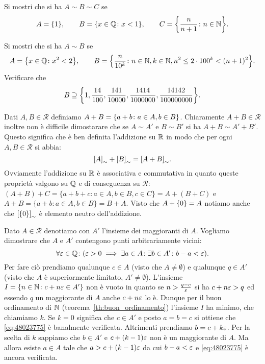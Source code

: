 \begin{exercise}
  Si mostri che si ha $A \sim B \sim C$ se
  \[
  A = {\left\{ 1 \right\}}, \qquad 
  B = {\left\{ x\in {\mathbb Q}\colon x<1 \right\}}, \qquad
  C = {\left\{ \frac{n}{n+1}\colon n\in {\mathbb N} \right\}}.
  \]
\end{exercise}

\begin{exercise}
  Si mostri che si ha $A\sim B$ se
  \[
  A = {\left\{ x\in {\mathbb Q}\colon x^2<2 \right\}}, \qquad
  B = {\left\{ \frac{n}{10^k}\colon n\in {\mathbb N}, k\in {\mathbb N}, n^2 \le 2\cdot 100^k < (n+1)^2 \right\}}.  
  \]
  Verificare che 
  \[
    B \supseteq {\left\{ 
      1,\frac{14}{100},\frac{141}{10000},\frac{1414}{1000000},
      \frac{14142}{100000000} \right\}}.
  \]
\end{exercise}

Dati $A,B\in\mathcal R$ definiamo $A+B={\left\{ a+b\colon a\in A, b\in B \right\}}$.
Chiaramente $A+B\in \mathcal R$ inoltre non è difficile dimostarare che 
se $A\sim A'$ e $B\sim B'$ si ha $A+B\sim A'+B'$.
Questo significa che è ben definita l'addizione su ${\mathbb R}$ in modo che 
per ogni $A,B \in \mathcal R$ si abbia:
\[
{\left[ A \right]}_\sim + {\left[ B \right]}_\sim = {\left[ A+B \right]}_\sim.
\]
Ovviamente l'addizione su ${\mathbb R}$ è associativa e commutativa in quanto 
queste proprietà valgono su ${\mathbb Q}$ e di conseguenza su $\mathcal R$:
$(A+B)+C = \{ a+b+c\colon a\in A, b\in B, c\in C\} = A + (B+C)$ e 
$A+B = \{a+b\colon a\in A, b\in B\} = B+A$.
Visto che $A+{\left\{ 0 \right\}} = A$ notiamo anche che ${\left[ {\left\{ 0 \right\}} \right]}_\sim$ 
è elemento neutro dell'addizione.

Dato $A\in \mathcal R$ denotiamo con $A'$ l'insieme dei maggioranti di $A$.
Vogliamo dimostrare che $A$ e $A'$ contengono punti arbitrariamente vicini:
\begin{equation}\label{eq:48023775}
\forall \varepsilon\in{\mathbb Q}\colon (\varepsilon >0 \implies \exists a \in A\colon \exists b\in A'\colon
b-a < \varepsilon).
\end{equation}
Per fare ciò prendiamo qualunque $c\in A$ (visto che $A\neq \emptyset$)
e qualunque $q\in A'$ (visto che $A$ è superiormente limitato, $A'\neq \emptyset$).
L'insieme $I={\left\{ n\in {\mathbb N} \colon c+n\varepsilon\in A' \right\}}$
non è vuoto in quanto se $n>\frac{q-c}{\varepsilon}$ si ha $c+n\varepsilon>q$ ed essendo $q$ 
un maggiorante di $A$ anche $c+n\varepsilon$ lo è.
Dunque per il buon ordinamento di ${\mathbb N}$ (teorema~\ref{th:buon_ordinamento})
l'insieme $I$ ha minimo, che chiamiamo $k$.
Se $k=0$ significa che $c\in A'$ e posto $a=b=c$ si ottiene 
che \eqref{eq:48023775} è banalmente verificata.
Altrimenti prendiamo $b=c+k\varepsilon$.
Per la scelta di $k$ sappiamo che $b\in A'$ e $c+(k-1)\varepsilon$ non è un maggiorante di 
$A$. 
Ma allora esiste $a\in A$ tale che $a>c+(k-1)\varepsilon$ da cui 
$b-a < \varepsilon$ e \eqref{eq:48023775} è ancora verificata.

